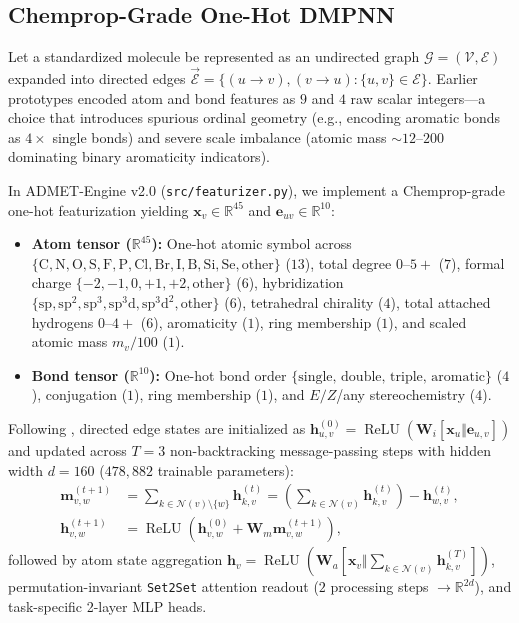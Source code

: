 \documentclass[10pt,twocolumn,letterpaper]{article}
\begin{document}
\subsection{Chemprop-Grade One-Hot DMPNN}
Let a standardized molecule be represented as an undirected graph $\mathcal{G} = (\mathcal{V}, \mathcal{E})$ expanded into directed edges $\vec{\mathcal{E}} = \{(u\!\to\!v), (v\!\to\!u) : \{u,v\} \in \mathcal{E}\}$. Earlier prototypes encoded atom and bond features as $9$ and $4$ raw scalar integers—a choice that introduces spurious ordinal geometry (e.g., encoding aromatic bonds as $4\times$ single bonds) and severe scale imbalance (atomic mass $\sim 12$–$200$ dominating binary aromaticity indicators).

In ADMET-Engine v2.0 (\texttt{src/featurizer.py}), we implement a Chemprop-grade one-hot featurization yielding $\mathbf{x}_v \in \mathbb{R}^{45}$ and $\mathbf{e}_{uv} \in \mathbb{R}^{10}$:
\begin{itemize}
  \item \textbf{Atom tensor ($\mathbb{R}^{45}$):} One-hot atomic symbol across $\{\mathrm{C,N,O,S,F,P,Cl,Br,I,B,Si,Se,other}\}$ ($13$), total degree $0$–$5+$ ($7$), formal charge $\{-2,-1,0,+1,+2,\text{other}\}$ ($6$), hybridization $\{\mathrm{sp,sp^2,sp^3,sp^3d,sp^3d^2,other}\}$ ($6$), tetrahedral chirality ($4$), total attached hydrogens $0$–$4+$ ($6$), aromaticity ($1$), ring membership ($1$), and scaled atomic mass $m_v / 100$ ($1$).
  \item \textbf{Bond tensor ($\mathbb{R}^{10}$):} One-hot bond order $\{\text{single, double, triple, aromatic}\}$ ($4$), conjugation ($1$), ring membership ($1$), and $E/Z$/any stereochemistry ($4$).
\end{itemize}

Following \citet{yang2019analyzing}, directed edge states are initialized as $\mathbf{h}_{u,v}^{(0)} = \operatorname{ReLU}(\mathbf{W}_i [\mathbf{x}_u \Vert \mathbf{e}_{u,v}])$ and updated across $T = 3$ non-backtracking message-passing steps with hidden width $d = 160$ ($478{,}882$ trainable parameters):
\begin{align}
  \mathbf{m}_{v,w}^{(t+1)} &= \sum_{k \in \mathcal{N}(v) \setminus \{w\}} \mathbf{h}_{k,v}^{(t)}
  = \left(\sum_{k \in \mathcal{N}(v)} \mathbf{h}_{k,v}^{(t)}\right) - \mathbf{h}_{w,v}^{(t)}, \label{eq:dmpnn_msg}\\
  \mathbf{h}_{v,w}^{(t+1)} &= \operatorname{ReLU}\!\left(\mathbf{h}_{v,w}^{(0)} + \mathbf{W}_m \mathbf{m}_{v,w}^{(t+1)}\right), \label{eq:dmpnn_upd}
\end{align}
followed by atom state aggregation $\mathbf{h}_v = \operatorname{ReLU}(\mathbf{W}_a [\mathbf{x}_v \Vert \sum_{k \in \mathcal{N}(v)} \mathbf{h}_{k,v}^{(T)}])$, permutation-invariant \texttt{Set2Set} attention readout \citep{vinyals2016order} ($2$ processing steps $\to \mathbb{R}^{2d}$), and task-specific 2-layer \textsc{MLP} heads.
\end{document}
